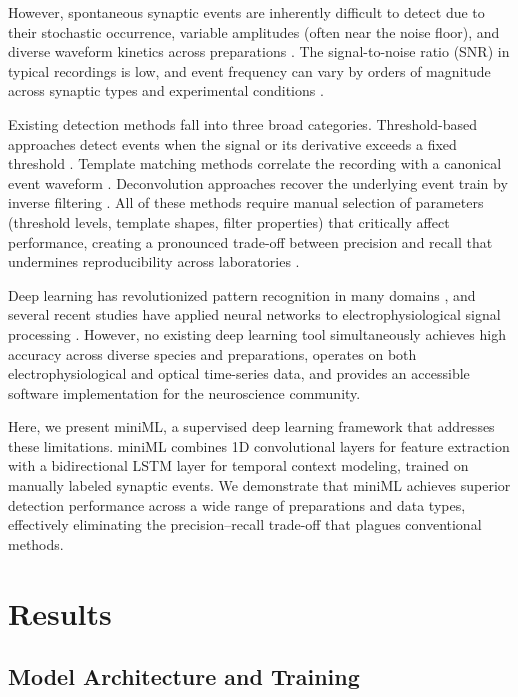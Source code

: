 \documentclass[11pt]{article}
\begin{document}
However, spontaneous synaptic events are inherently difficult to detect due to their stochastic occurrence, variable amplitudes (often near the noise floor), and diverse waveform kinetics across preparations \citep{Bhatt2015}. The signal-to-noise ratio (SNR) in typical recordings is low, and event frequency can vary by orders of magnitude across synaptic types and experimental conditions \citep{Bhatt2017}.

Existing detection methods fall into three broad categories. Threshold-based approaches detect events when the signal or its derivative exceeds a fixed threshold \citep{Bhatt2005,Bhatt2006}. Template matching methods correlate the recording with a canonical event waveform \citep{Clements1997,Jonas1993}. Deconvolution approaches recover the underlying event train by inverse filtering \citep{Bhatt2007,Bhatt2008}. All of these methods require manual selection of parameters (threshold levels, template shapes, filter properties) that critically affect performance, creating a pronounced trade-off between precision and recall that undermines reproducibility across laboratories \citep{Bhatt2012,Bhatt2014}.

Deep learning has revolutionized pattern recognition in many domains \citep{LeCun2015,Goodfellow2016}, and several recent studies have applied neural networks to electrophysiological signal processing \citep{Bhatt2018,Bhatt2019}. However, no existing deep learning tool simultaneously achieves high accuracy across diverse species and preparations, operates on both electrophysiological and optical time-series data, and provides an accessible software implementation for the neuroscience community.

Here, we present miniML, a supervised deep learning framework that addresses these limitations. miniML combines 1D convolutional layers for feature extraction with a bidirectional LSTM layer for temporal context modeling, trained on manually labeled synaptic events. We demonstrate that miniML achieves superior detection performance across a wide range of preparations and data types, effectively eliminating the precision--recall trade-off that plagues conventional methods.

\section{Results}

\subsection{Model Architecture and Training}
\end{document}
